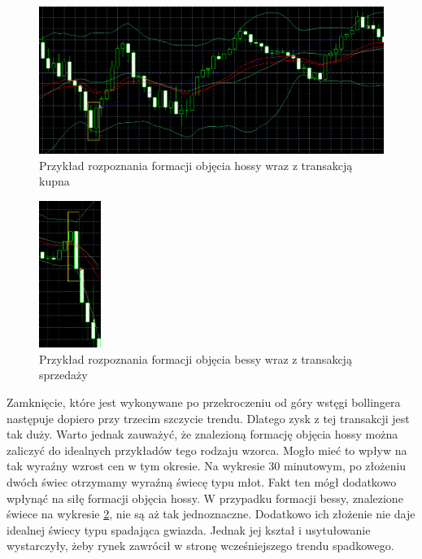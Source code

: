 \documentclass[pdflatex,11pt]{aghdpl}
\begin{document}
\begin{figure}[h!]
\begin{center}
\includegraphics[width=14cm]{bullishengulfing/przyklad.png}
\caption{Przykład rozpoznania formacji objęcia hossy wraz z transakcją kupna}
\label{przyklad_objecie_hossy}
\end{center}
\end{figure} 
\begin{figure}[h!]
\begin{center}
\includegraphics[width=2cm]{bearishengulfing/przyklad.png}
\caption{Przykład rozpoznania formacji objęcia bessy wraz z transakcją sprzedaży}
\label{przyklad_objecie_bessy}
\end{center}
\end{figure} 
Zamknięcie, które jest wykonywane po przekroczeniu od góry wstęgi bollingera następuje dopiero przy trzecim szczycie trendu. Dlatego zysk z tej transakcji jest tak duży. Warto jednak zauważyć, że znalezioną formację objęcia hossy można zaliczyć do idealnych przykładów tego rodzaju wzorca. Mogło mieć to wpływ na tak wyraźny wzrost cen w tym okresie. Na wykresie 30 minutowym, po złożeniu dwóch świec otrzymamy wyraźną świecę typu młot. Fakt ten mógł dodatkowo wpłynąć na siłę formacji objęcia hossy. W przypadku formacji bessy, znalezione świece na wykresie \ref{przyklad_objecie_bessy}, nie są aż tak jednoznaczne. Dodatkowo ich złożenie nie daje idealnej świecy typu spadająca gwiazda. Jednak jej kształ i usytułowanie wystarczyły, żeby rynek zawrócił w stronę wcześniejszego trendu spadkowego.
\end{document}
